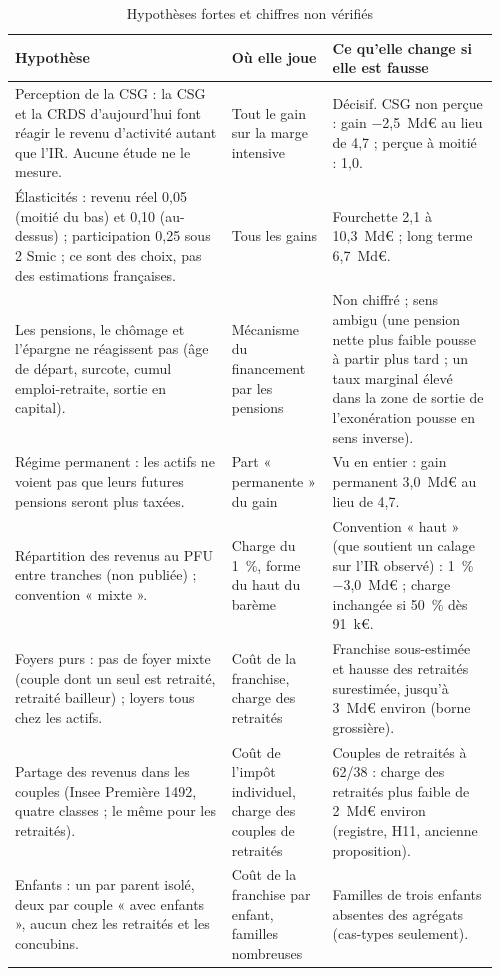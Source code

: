 \begin{table}[!htbp]\centering\scriptsize\setlength{\tabcolsep}{3pt}
\caption{Hypothèses fortes et chiffres non vérifiés}\label{tab:ircsg_hyp}
\begin{tabular}{@{}p{0.43\linewidth}p{0.2\linewidth}p{0.33\linewidth}@{}}
\toprule
Hypothèse & Où elle joue & Ce qu'elle change si elle est fausse \\
\midrule
Perception de la CSG : la CSG et la CRDS d'aujourd'hui font réagir le revenu d'activité autant que l'IR. Aucune étude ne le mesure. & Tout le gain sur la marge intensive & Décisif. CSG non perçue : gain $-$2,5~Md€ au lieu de 4,7 ; perçue à moitié : 1,0. \\[2pt]
Élasticités : revenu réel 0,05 (moitié du bas) et 0,10 (au-dessus) ; participation 0,25 sous 2 Smic ; ce sont des choix, pas des estimations françaises. & Tous les gains & Fourchette 2,1 à 10,3~Md€ ; long terme 6,7~Md€. \\[2pt]
Les pensions, le chômage et l'épargne ne réagissent pas (âge de départ, surcote, cumul emploi-retraite, sortie en capital). & Mécanisme du financement par les pensions & Non chiffré ; sens ambigu (une pension nette plus faible pousse à partir plus tard ; un taux marginal élevé dans la zone de sortie de l'exonération pousse en sens inverse). \\[2pt]
Régime permanent : les actifs ne voient pas que leurs futures pensions seront plus taxées. & Part « permanente » du gain & Vu en entier : gain permanent 3,0~Md€ au lieu de 4,7. \\[2pt]
Répartition des revenus au PFU entre tranches (non publiée) ; convention « mixte ». & Charge du 1~\%, forme du haut du barème & Convention « haut » (que soutient un calage sur l'IR observé) : 1~\% $-$3,0~Md€ ; charge inchangée si 50~\% dès 91~k€. \\[2pt]
Foyers purs : pas de foyer mixte (couple dont un seul est retraité, retraité bailleur) ; loyers tous chez les actifs. & Coût de la franchise, charge des retraités & Franchise sous-estimée et hausse des retraités surestimée, jusqu'à 3~Md€ environ (borne grossière). \\[2pt]
Partage des revenus dans les couples (Insee Première 1492, quatre classes ; le même pour les retraités). & Coût de l'impôt individuel, charge des couples de retraités & Couples de retraités à 62/38 : charge des retraités plus faible de 2~Md€ environ (registre, H11, ancienne proposition). \\[2pt]
Enfants : un par parent isolé, deux par couple « avec enfants », aucun chez les retraités et les concubins. & Coût de la franchise par enfant, familles nombreuses & Familles de trois enfants absentes des agrégats (cas-types seulement). \\[2pt]

\end{tabular}
\end{table}
